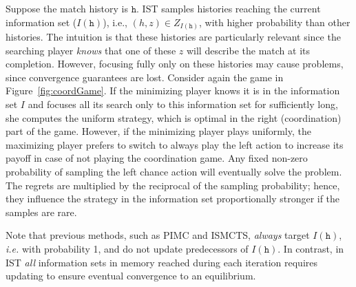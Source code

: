 \documentclass[letterpaper]{article}
\newcommand{\tth}{\mathtt{h}}
\newcommand{\ie}{{\it i.e.}\xspace}
\newcounter{vlNoteCounter}
\newcommand{\vlnote}[1]{{\scriptsize \color{blue} $\blacksquare$ \refstepcounter{vlNoteCounter}\textsf{[VL]$_{\arabic{vlNoteCounter}}$:{#1}}}}
\begin{document}
Suppose the match history is $\tth$. IST samples histories reaching the current information set ($I(\tth)$), 
i.e., $(h,z) \in Z_{I(\tth)}$, with higher probability than other histories.
The intuition is that these histories are particularly 
relevant since the searching player {\it knows} that one of these $z$ will describe the match at its completion. 
However, focusing fully only on these histories may cause problems, since convergence guarantees are lost.
Consider again the game in Figure~\ref{fig:coordGame}. 
If the minimizing player knows it is in the information set $I$ and focuses all its search only to this information set for sufficiently long, she computes the uniform strategy, which is optimal in the right (coordination) part of the game.
However, if the minimizing player plays uniformly, the maximizing player prefers to switch to always play the left action to increase its payoff in case of not playing the coordination game. Any fixed non-zero probability of sampling the left chance action will 
eventually solve the problem. The regrets are multiplied by the reciprocal of the sampling probability; hence, they influence the strategy 
in the information set proportionally stronger if the samples are rare. 

Note that previous methods, such as PIMC and ISMCTS, {\it always} target $I(\tth)$, \ie with probability 1, and do not 
update predecessors of $I(\tth)$. In contrast, in IST {\it all} information sets in memory reached during each iteration requires updating 
to ensure eventual convergence to an equilibrium.


\end{document}
